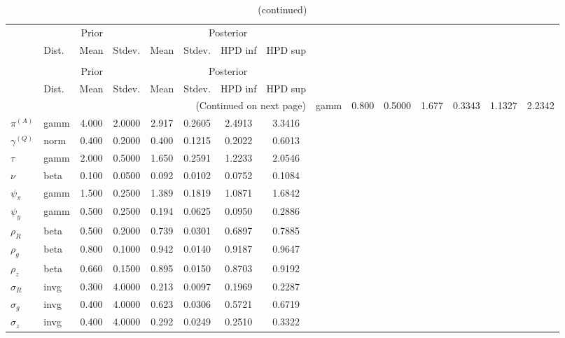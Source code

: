  
\begin{center}
\begin{longtable}{llcccccc} 
\caption{Results from Metropolis-Hastings (parameters)}
 \label{Table:MHPosterior:1}\\
\toprule 
  & \multicolumn{3}{c}{Prior}  &  \multicolumn{4}{c}{Posterior} \\
  \cmidrule(r{.75em}){2-4} \cmidrule(r{.75em}){5-8}
  & Dist. & Mean  & Stdev. & Mean & Stdev. & HPD inf & HPD sup\\
\midrule \endfirsthead 
\caption{(continued)}\\\toprule 
  & \multicolumn{3}{c}{Prior}  &  \multicolumn{4}{c}{Posterior} \\
  \cmidrule(r{.75em}){2-4} \cmidrule(r{.75em}){5-8}
  & Dist. & Mean  & Stdev. & Mean & Stdev. & HPD inf & HPD sup\\
\midrule \endhead 
\bottomrule \multicolumn{8}{r}{(Continued on next page)} \endfoot 
\bottomrule \endlastfoot 
${r_{A}}$ & gamm &   0.800 & 0.5000 &   1.677& 0.3343 &  1.1327 &  2.2342 \\ 
${\pi^{(A)}}$ & gamm &   4.000 & 2.0000 &   2.917& 0.2605 &  2.4913 &  3.3416 \\ 
${\gamma^{(Q)}}$ & norm &   0.400 & 0.2000 &   0.400& 0.1215 &  0.2022 &  0.6013 \\ 
${\tau}$ & gamm &   2.000 & 0.5000 &   1.650& 0.2591 &  1.2233 &  2.0546 \\ 
${\nu}$ & beta &   0.100 & 0.0500 &   0.092& 0.0102 &  0.0752 &  0.1084 \\ 
${\psi_\pi}$ & gamm &   1.500 & 0.2500 &   1.389& 0.1819 &  1.0871 &  1.6842 \\ 
${\psi_y}$ & gamm &   0.500 & 0.2500 &   0.194& 0.0625 &  0.0950 &  0.2886 \\ 
${\rho_R}$ & beta &   0.500 & 0.2000 &   0.739& 0.0301 &  0.6897 &  0.7885 \\ 
${\rho_{g}}$ & beta &   0.800 & 0.1000 &   0.942& 0.0140 &  0.9187 &  0.9647 \\ 
${\rho_z}$ & beta &   0.660 & 0.1500 &   0.895& 0.0150 &  0.8703 &  0.9192 \\ 
${\sigma_R}$ & invg &   0.300 & 4.0000 &   0.213& 0.0097 &  0.1969 &  0.2287 \\ 
${\sigma_{g}}$ & invg &   0.400 & 4.0000 &   0.623& 0.0306 &  0.5721 &  0.6719 \\ 
${\sigma_z}$ & invg &   0.400 & 4.0000 &   0.292& 0.0249 &  0.2510 &  0.3322 \\ 
\end{longtable}
 \end{center}
